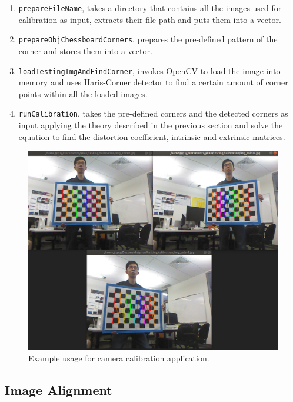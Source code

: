 \begin{enumerate}
    \item \texttt{prepareFileName}, takes a directory that contains all the images
    used for calibration as input, extracts their file path and puts them into a
    vector.
    \item \texttt{prepareObjChessboardCorners}, prepares the pre-defined
    pattern of the corner and stores them into a vector.
    \item \texttt{loadTestingImgAndFindCorner}, invokes OpenCV to load
    the image into memory and uses Haris-Corner detector to find a certain
    amount of corner points within all the loaded images.
    \item \texttt{runCalibration}, takes the pre-defined corners and the
    detected corners as input applying the theory described in the previous 
    section and solve the equation to find the distortion coefficient, 
    intrinsic and extrinsic matrices.
\end{enumerate}

\begin{figure}
    \centering
    \includegraphics[width=\linewidth]{figures/framework_app_calib.png}
    \caption{Example usage for camera calibration application.}
    \label{fig:fw-app-calib}
\end{figure}

\subsection{Image Alignment}
\label{sec:Impl-fw-app-align}

